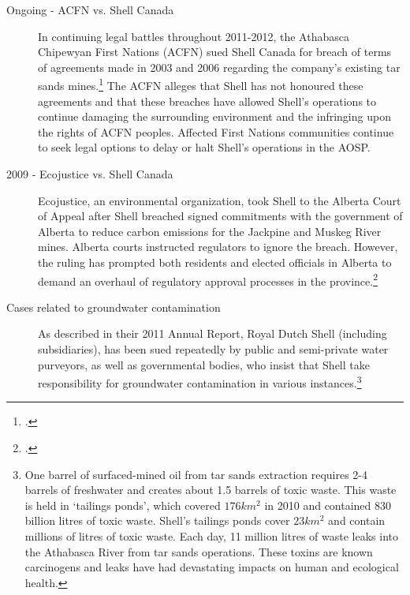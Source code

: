 \begin{description}
	\item [Ongoing - ACFN vs. Shell Canada] In continuing legal battles throughout 2011-2012, the Athabasca Chipewyan First Nations (ACFN) sued Shell Canada for breach of terms of agreements made in 2003 and 2006 regarding the company's existing tar sands mines.\footcite{FNSues} The ACFN alleges that Shell has not honoured these agreements and that these breaches have allowed Shell's operations to continue damaging the surrounding environment and the infringing upon the rights of ACFN peoples. Affected First Nations communities continue to seek legal options to delay or halt Shell's operations in the AOSP.
	\item [2009 - Ecojustice vs. Shell Canada] Ecojustice, an environmental organization, took Shell to the Alberta Court of Appeal after Shell breached signed commitments with the government of Alberta to reduce carbon emissions for the Jackpine and Muskeg River mines. Alberta courts instructed regulators to ignore the breach. However, the ruling has prompted both residents and elected officials in Alberta to demand an overhaul of regulatory approval processes in the province.\footcite[][]{RiskingRuin_2012}
	\item [Cases related to groundwater contamination] As described in their 2011 Annual Report, Royal Dutch Shell (including subsidiaries), has been sued repeatedly by public and semi-private water purveyors, as well as governmental bodies, who insist that Shell take responsibility for groundwater contamination in various instances.\footnote{One barrel of surfaced-mined oil from tar sands extraction requires 2-4 barrels of freshwater and creates about 1.5 barrels of toxic waste. This waste is held in `tailings ponds', which covered $176 km^2$ in 2010 and contained 830 billion litres of toxic waste. Shell's tailings ponds cover $23 km^2$ and contain millions of litres of toxic waste. Each day, 11 million litres of waste leaks into the Athabasca River from tar sands operations. These toxins are known carcinogens and leaks have had devastating impacts on human and ecological health.} 

\end{description}
